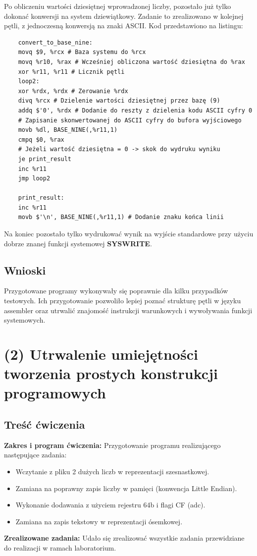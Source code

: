 \documentclass[a4paper,12pt]{article}
\begin{document}
Po obliczeniu wartości dziesiętnej wprowadzonej liczby, pozostało już tylko dokonać konwersji na system dziewiątkowy. Zadanie to zrealizowano w kolejnej pętli, z jednoczesną konwersją na znaki ASCII. Kod przedstawiono na listingu:
\begin{verbatim}
	convert_to_base_nine:
	movq $9, %rcx # Baza systemu do %rcx
	movq %r10, %rax # Wcześniej obliczona wartość dziesiętna do %rax
	xor %r11, %r11 # Licznik pętli
	loop2:
	xor %rdx, %rdx # Zerowanie %rdx
	divq %rcx # Dzielenie wartości dziesiętnej przez bazę (9)
	addq $'0', %rdx # Dodanie do reszty z dzielenia kodu ASCII cyfry 0
	# Zapisanie skonwertowanej do ASCII cyfry do bufora wyjściowego
	movb %dl, BASE_NINE(,%r11,1) 
	cmpq $0, %rax 
	# Jeżeli wartość dziesiętna = 0 -> skok do wydruku wyniku
	je print_result 
	inc %r11
	jmp loop2
	
	print_result:
	inc %r11
	movb $'\n', BASE_NINE(,%r11,1) # Dodanie znaku końca linii
\end{verbatim}
Na koniec pozostało tylko wydrukować wynik na wyjście standardowe przy użyciu dobrze znanej funkcji systemowej \textbf{SYSWRITE}.
\subsection{Wnioski}
Przygotowane programy wykonywały się poprawnie dla kilku przypadków testowych. Ich przygotowanie pozwoliło lepiej poznać strukturę pętli w języku assembler oraz utrwalić znajomość instrukcji warunkowych i wywoływania funkcji systemowych. 
\newpage
\section{(2) Utrwalenie umiejętności tworzenia prostych konstrukcji programowych}
\subsection{Treść ćwiczenia}
\textbf{Zakres i program ćwiczenia:}
Przygotowanie programu realizującego następujące zadania:
\begin{itemize}
	\item Wczytanie z pliku 2 dużych liczb w reprezentacji szesnastkowej.
	\item Zamiana na poprawny zapis liczby w pamięci (konwencja Little Endian).
	\item Wykonanie dodawania z użyciem rejestru 64b i flagi CF (adc).
	\item Zamiana na zapis tekstowy w reprezentacji ósemkowej.
\end{itemize}
\textbf{Zrealizowane zadania:}
Udało się zrealizować wszystkie zadania przewidziane do realizacji w ramach laboratorium.
\end{document}
